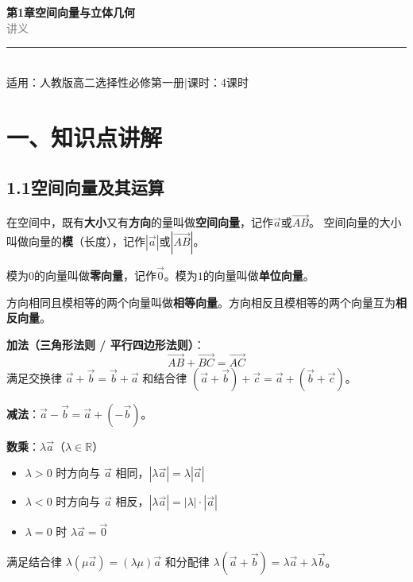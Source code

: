 \documentclass[12pt, a4paper]{ctexart}
\begin{document}
\begin{center}
{\Huge\bfseries\textcolor{mainblue}{第1章\quad 空间向量与立体几何}}\\[12pt]
{\Large\textcolor{gray}{讲\quad 义}}\\[8pt]
\rule{0.6\textwidth}{1pt}\\[8pt]
{\normalsize 适用：人教版\quad 高二选择性必修第一册\quad |\quad 课时：4课时}
\end{center}
\vspace{10pt}

\section*{\textcolor{mainblue}{一、知识点讲解}}

\subsection*{1.1\quad 空间向量及其运算}

\begin{knowledgebox}[空间向量的概念]
在空间中，既有\textbf{大小}又有\textbf{方向}的量叫做\textbf{空间向量}，记作$\vec{a}$或$\overrightarrow{AB}$。
空间向量的大小叫做向量的\textbf{模}（长度），记作$|\vec{a}|$或$|\overrightarrow{AB}|$。

模为$0$的向量叫做\textbf{零向量}，记作$\vec{0}$。模为$1$的向量叫做\textbf{单位向量}。

方向相同且模相等的两个向量叫做\textbf{相等向量}。方向相反且模相等的两个向量互为\textbf{相反向量}。
\end{knowledgebox}

\begin{knowledgebox}[空间向量的线性运算]
\textbf{加法（三角形法则 / 平行四边形法则）}：
\[
\overrightarrow{AB}+\overrightarrow{BC}=\overrightarrow{AC}
\]
满足交换律 $\vec{a}+\vec{b}=\vec{b}+\vec{a}$ 和结合律 $(\vec{a}+\vec{b})+\vec{c}=\vec{a}+(\vec{b}+\vec{c})$。

\textbf{减法}：$\vec{a}-\vec{b}=\vec{a}+(-\vec{b})$。

\textbf{数乘}：$\lambda\vec{a}$（$\lambda\in\mathbb{R}$）
\begin{itemize}[nosep]
  \item $\lambda>0$ 时方向与 $\vec{a}$ 相同，$|\lambda\vec{a}|=\lambda|\vec{a}|$
  \item $\lambda<0$ 时方向与 $\vec{a}$ 相反，$|\lambda\vec{a}|=|\lambda|\cdot|\vec{a}|$
  \item $\lambda=0$ 时 $\lambda\vec{a}=\vec{0}$
\end{itemize}
满足结合律 $\lambda(\mu\vec{a})=(\lambda\mu)\vec{a}$ 和分配律 $\lambda(\vec{a}+\vec{b})=\lambda\vec{a}+\lambda\vec{b}$。
\end{knowledgebox}
\end{document}
